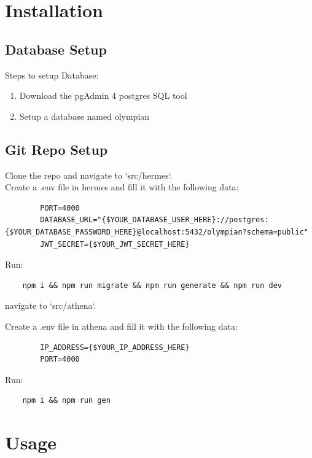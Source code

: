 \documentclass{article}
\begin{document}
\section{Installation}

\subsection{Database Setup}

Steps to setup Database:
\begin{enumerate}
    \item Download the pgAdmin 4 postgres SQL tool
    \item Setup a database named olympian
\end{enumerate}

\subsection{Git Repo Setup}
    Clone the repo and navigate to `src/hermes`.\\
    Create a .env file in hermes and fill it with the following data:

    \begin{verbatim}
        PORT=4000
        DATABASE_URL="{$YOUR_DATABASE_USER_HERE}://postgres:{$YOUR_DATABASE_PASSWORD_HERE}@localhost:5432/olympian?schema=public"
        JWT_SECRET={$YOUR_JWT_SECRET_HERE}
    \end{verbatim}

    Run:
    \begin{verbatim}
    npm i && npm run migrate && npm run generate && npm run dev
    \end{verbatim}

    navigate to `src/athena`. 
    
    Create a .env file in athena and fill it with the following data:

    \begin{verbatim}
        IP_ADDRESS={$YOUR_IP_ADDRESS_HERE}
        PORT=4000
    \end{verbatim}

    Run:
    \begin{verbatim}
    npm i && npm run gen
    \end{verbatim}

\section{Usage}
\end{document}
